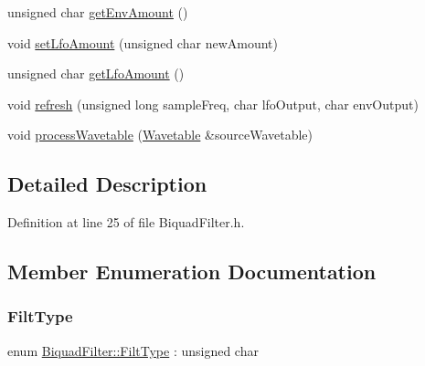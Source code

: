 \begin{DoxyCompactItemize}
unsigned char \hyperlink{class_biquad_filter_a00fd6c36ca50169705ad5c00560341d9}{get\+Env\+Amount} ()
\item 
void \hyperlink{class_biquad_filter_a57c5069dadf75d44783a2fb20dadfbc4}{set\+Lfo\+Amount} (unsigned char new\+Amount)
\item 
unsigned char \hyperlink{class_biquad_filter_aa6cee8e0caed47a12edb5f58b40b0561}{get\+Lfo\+Amount} ()
\item 
void \hyperlink{class_biquad_filter_a6b84cee1d3982596d90d3b1a74208b2a}{refresh} (unsigned long sample\+Freq, char lfo\+Output, char env\+Output)
\item 
void \hyperlink{class_biquad_filter_a205ea1f856a52f5d369d45cf385df801}{process\+Wavetable} (\hyperlink{class_wavetable}{Wavetable} \&source\+Wavetable)
\end{DoxyCompactItemize}


\subsection{Detailed Description}


Definition at line 25 of file Biquad\+Filter.\+h.



\subsection{Member Enumeration Documentation}
\mbox{\label{class_biquad_filter_a173337ea2d17607e19495cf7b91f1110}} 
\subsubsection{\texorpdfstring{Filt\+Type}{FiltType}}
{\footnotesize\ttfamily enum \hyperlink{class_biquad_filter_a173337ea2d17607e19495cf7b91f1110}{Biquad\+Filter\+::\+Filt\+Type} \+: unsigned char}

